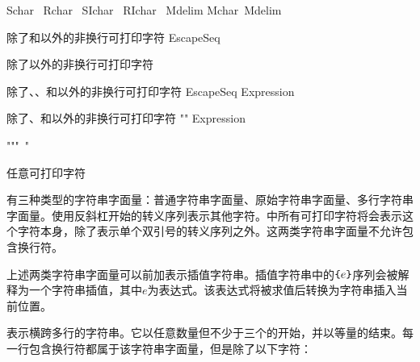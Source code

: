 \begin{bnf}
 \br
     Schar\bnfs\  \br
     Rchar\bnfs\  \br
     SIchar\bnfs\  \br
     RIchar\bnfs\  \br
    Mdelim Mchar\bnfs\ Mdelim
\end{bnf}

\begin{bnf}
 \br
    \textnormal{除了\terminal{\textbackslash}和以外的非换行可打印字符} \br
    EscapeSeq
\end{bnf}

\begin{bnf}
 \br
    \textnormal{除了以外的非换行可打印字符}
\end{bnf}

\begin{bnf}
 \br
    \textnormal{除了\terminal{\textbackslash}、、\terminal{\{}和\terminal{\}}以外的非换行可打印字符} \br
    EscapeSeq \br
    \terminal{\{} Expression \terminal{\}} \br
    \terminal{\{\{} \br
    \terminal{\}\}}
\end{bnf}

\begin{bnf}
 \br
    \textnormal{除了、\terminal{\{}和\terminal{\}}以外的非换行可打印字符} \br
    "" \br
    \terminal{\{} Expression \terminal{\}} \br
    \terminal{\{\{} \br
    \terminal{\}\}}
\end{bnf}

\begin{bnf}
 \br
    """\ "\bnfs
\end{bnf}

\begin{bnf}
 \br
    \textnormal{任意可打印字符}
\end{bnf}

\pnum
有三种类型的字符串字面量：普通字符串字面量、原始字符串字面量、多行字符串字面量。使用反斜杠开始的转义序列表示其他字符。中所有可打印字符将会表示这个字符本身，除了表示单个双引号的转义序列之外。这两类字符串字面量不允许包含换行符。

\pnum
上述两类字符串字面量可以前加\tcode{\$}表示插值字符串。插值字符串中的$\texttt{\{}e\texttt{\}}$序列会被解释为一个字符串插值，其中$e$为表达式。该表达式将被求值后转换为字符串插入当前位置。

\pnum
{}表示横跨多行的字符串。它以任意数量但不少于三个的开始，并以等量的结束。每一行包含换行符都属于该字符串字面量，但是除了以下字符：

